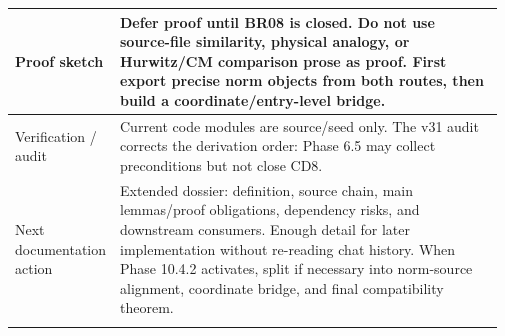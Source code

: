 \begin{longtable}{L{0.16\linewidth} L{0.81\linewidth}}
\hline\addlinespace[0.20em]
Proof sketch & Defer proof until BR08 is closed. Do not use source-file similarity, physical analogy, or Hurwitz/\allowbreak{}CM comparison prose as proof. First export precise norm objects from both routes, then build a coordinate/\allowbreak{}entry-level bridge.\\
\hline\addlinespace[0.20em]
Verification /\allowbreak{} audit & Current code modules are source/\allowbreak{}seed only. The v31 audit corrects the derivation order: Phase 6.5 may collect preconditions but not close CD8.\\
\hline\addlinespace[0.20em]
Next documentation action & Extended dossier: definition, source chain, main lemmas/\allowbreak{}proof obligations, dependency risks, and downstream consumers. Enough detail for later implementation without re-reading chat history. When Phase 10.4.2 activates, split if necessary into norm-source alignment, coordinate bridge, and final compatibility theorem.\\
\hline\addlinespace[0.20em]
\end{longtable}
